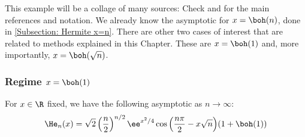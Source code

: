 This example will be a collage of many sources: Check \cite{shi2021errorboundsasymptoticexpansions} and \cite{nica2025gaussianintegralformulahermite} for the main references and notation. We already know the asymptotic for $x = \boh(n)$, done in \ref{Subsection: Hermite x=n}. There are other two cases of interest that are related to methods explained in this Chapter. These are $x=\boh(1)$ and, more importantly, $x = \boh(\sqrt{n})$.

\subsubsection{Regime $x = \boh(1)$}
\label{SubSection: Hermite x=o(1)}

\begin{prop}
	For $x \in \R$ fixed, we have the following asymptotic as $n \rightarrow \infty$:
	\begin{equation}
		\He_n(x) = \sqrt{2} \left(\frac{n}{2}\right)^{n/2} \ee^{x^2/4} \cos{\left(\frac{n\pi}{2} - x \sqrt{n}\right)} (1 + \boh(1))
	\end{equation}
\end{prop}
